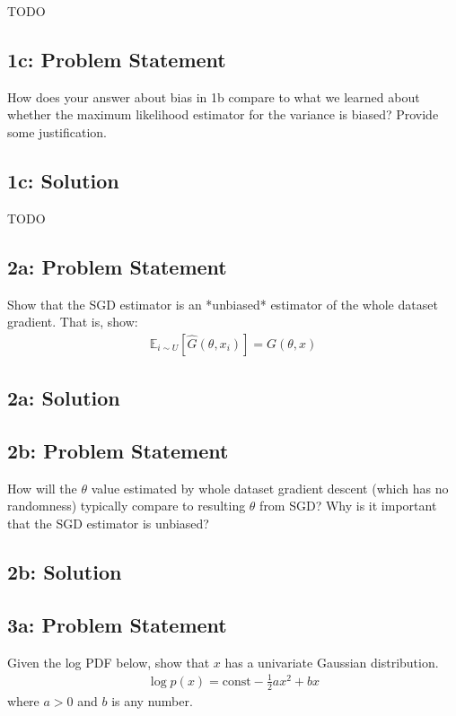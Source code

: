 \documentclass[12pt]{article}
\newcommand{\officialdirections}[1]{{\color{blue} #1}}
\begin{document}
TODO



\officialdirections{
\subsection*{1c: Problem Statement}
How does your answer about bias in 1b compare to what we learned about whether the maximum likelihood estimator for the variance is biased? Provide some justification.
}

\subsection{1c: Solution}
TODO




\newpage
\officialdirections{
\subsection*{2a: Problem Statement}

Show that the SGD estimator is an *unbiased* estimator of the whole dataset gradient. That is, show:
\begin{align}
\mathbb{E}_{i \sim U}[ \hat{G}(\theta, x_i) ] = G(\theta, x)
\end{align}
}

\subsection{2a: Solution}




\newpage
\officialdirections{
\subsection*{2b: Problem Statement}
How will the $\theta$ value estimated by whole dataset gradient descent (which has no randomness) typically compare to resulting $\theta$ from SGD? Why is it important that the SGD estimator is unbiased?
}

\subsection{2b: Solution}






\newpage
\officialdirections{
\subsection*{3a: Problem Statement}
Given the log PDF below, show that $x$ has a univariate Gaussian distribution.
\begin{align}
\log p(x) = \text{const} - \frac{1}{2} a x^2 + bx
\end{align}
where $a > 0$ and $b$ is any number.
}
\end{document}
